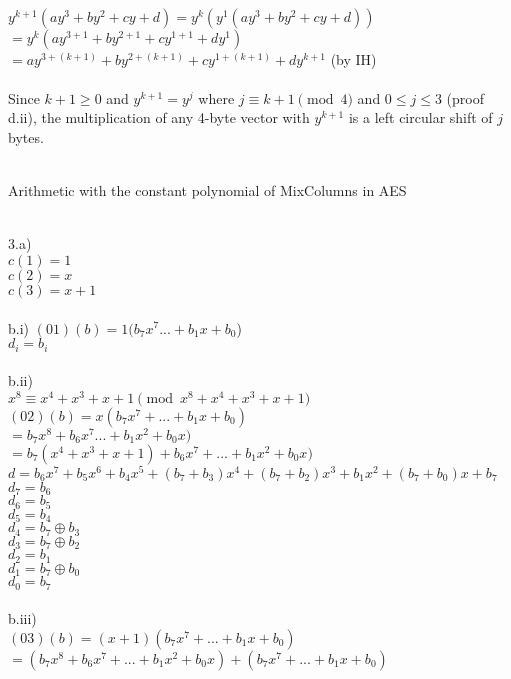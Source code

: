 \documentclass{assignment}
\begin{document}
\begin{problemlist}
\begin{problem}
\begin{answer}
\\
$y^{k+1}(ay^3+by^2+cy+d)= y^k(y^1(ay^3+by^2+cy+d))$\\
$= y^k(ay^{3+1}+by^{2+1}+cy^{1+1}+dy^{1})$\\
$= ay^{3+(k+1)}+by^{2+(k+1)}+cy^{1+(k+1)}+dy^{k+1}$ (by IH)\\
\\
Since $k+1\geq 0$ and $y^{k+1}=y^j$ where $j\equiv k+1 \pmod 4$ and $0\leq j\leq 3$ (proof d.ii), the multiplication of any 4-byte vector with $y^{k+1}$ is a left circular shift of $j$ bytes.\\
\\
\end{answer}
\end{problem}

\pbitem Arithmetic with the constant polynomial of MixColumns in AES
\begin{problem}
\begin{answer}
\\
3.a)\\
$c(1)=1$\\
$c(2)=x$\\
$c(3)=x+1$\\
\\
b.i)   
$(01)(b)=1(b_7x^7...+b_1x+b_0$)\\
$d_i=b_i$\\
\\
b.ii)\\
$x^8\equiv x^4+x^3+x+1 \pmod {x^8+x^4+x^3+x+1}$\\
$(02)(b)=x(b_7x^7+...+b_1x+b_0)$\\
$=b_7x^8+b_6x^7...+b_1x^2+b_0x)$\\
$=b_7(x^4+x^3+x+1)+b_6x^7+...+b_1x^2+b_0x)$\\
$d=b_6x^7+b_5x^6+b_4x^5+(b_7+b_3)x^4+(b_7+b_2)x^3+b_1x^2+(b_7+b_0)x+b_7$\\
$d_7=b_6$\\
$d_6=b_5$\\
$d_5=b_4$\\
$d_4=b_7\oplus b_3$\\
$d_3=b_7\oplus b_2$\\
$d_2=b_1$\\
$d_1=b_7\oplus b_0$\\
$d_0=b_7$\\
\\
b.iii)\\
$(03)(b)=(x+1)(b_7x^7+...+b_1x+b_0)$\\
$=(b_7x^8+b_6x^7+...+b_1x^2+b_0x)+(b_7x^7+...+b_1x+b_0)$\\

\end{answer}
\end{problem}
\end{problemlist}
\end{document}
